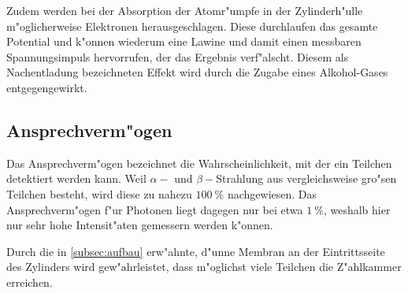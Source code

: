 		Zudem werden bei der Absorption der Atomr"umpfe in der Zylinderh"ulle m"oglicherweise Elektronen herausgeschlagen.
		Diese durchlaufen das gesamte Potential und k"onnen wiederum eine Lawine und damit einen messbaren Spannungsimpuls hervorrufen, der das Ergebnis verf"alscht.
		Diesem als Nachentladung bezeichneten Effekt wird durch die Zugabe eines Alkohol-Gases entgegengewirkt.

	\subsection{Ansprechverm"ogen}
	\label{subsec:ansprechvermoegen}
		Das Ansprechverm"ogen bezeichnet die Wahrscheinlichkeit, mit der ein Teilchen detektiert werden kann.
		Weil $\alpha-$ und $\beta-$Strahlung aus vergleichsweise gro"sen Teilchen besteht, wird diese zu nahezu $\SI{100}{\percent}$ nachgewiesen.
		Das Ansprechverm"ogen f"ur Photonen liegt dagegen nur bei etwa $\SI{1}{\percent}$, weshalb hier nur sehr hohe Intensit"aten gemessern werden k"onnen.

		Durch die in \ref{subsec:aufbau} erw"ahnte, d"unne Membran an der Eintrittsseite des Zylinders wird gew"ahrleistet, dass m"oglichst viele Teilchen die Z"ahlkammer erreichen.